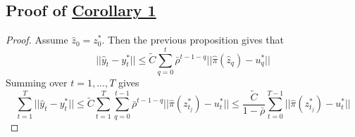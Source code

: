 \documentclass{l4dc2026}
\newcommand{\f}[2]{\frac{#1}{#2}}
\newcommand{\lm}{\limits}
\begin{document}
\subsection{Proof of \hyperref[boundcorollary]{Corollary 1}}
\begin{proof}
    Assume $\hat{z}_0 = z^*_0$. Then the previous proposition gives that \[||\hat{y}_t - y^*_t|| \le \tilde{C}\sum\lm_{q = 0}^t\bar\rho^{t - 1 - q}||\hat{\pi}(\hat{z}_q) - u^*_q||\]
    Summing over $t = 1, ..., T$ gives \[\sum\lm_{t = 1}^T||\hat{y}_t - y^*_t|| \le \tilde{C}\sum\lm_{t = 1}^T\sum\lm_{q = 0}^{t-1}\bar\rho^{t - 1 - q}||\hat{\pi}(z^*_{t_j}) - u^*_t|| \le \f{\tilde{C}}{1 - \bar\rho}\sum\lm_{t = 0}^{T-1}||\hat\pi(z^*_{t_j}) - u^*_t||\]
\end{proof}
\end{document}
